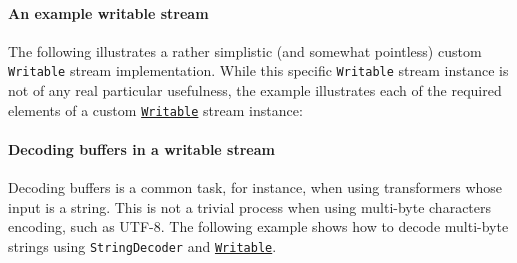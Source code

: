\paragraph{An example writable stream}\label{an-example-writable-stream}

The following illustrates a rather simplistic (and somewhat pointless)
custom \texttt{Writable} stream implementation. While this specific
\texttt{Writable} stream instance is not of any real particular
usefulness, the example illustrates each of the required elements of a
custom \hyperref[class-streamwritable]{\texttt{Writable}} stream
instance:

\begin{Shaded}
\begin{Highlighting}[]
\OperatorTok{=} \NormalTok{(}\NormalTok{)}\OperatorTok{;}

  \OperatorTok{,}\OperatorTok{,}
    \NormalTok{()}\NormalTok{(}\NormalTok{) }\OperatorTok{\textgreater{}=} \NormalTok{) \{}
      \NormalTok{(} \NormalTok{(}\NormalTok{))}\OperatorTok{;}
\NormalTok{    \} }\NormalTok{ \{}
      \NormalTok{()}\OperatorTok{;}
\NormalTok{    \}}
\NormalTok{  \}}
\NormalTok{\}}
\end{Highlighting}
\end{Shaded}

\paragraph{Decoding buffers in a writable
stream}\label{decoding-buffers-in-a-writable-stream}

Decoding buffers is a common task, for instance, when using transformers
whose input is a string. This is not a trivial process when using
multi-byte characters encoding, such as UTF-8. The following example
shows how to decode multi-byte strings using \texttt{StringDecoder} and
\hyperref[class-streamwritable]{\texttt{Writable}}.


